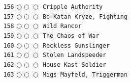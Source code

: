 \documentclass[a4paper,landscape]{article}
\begin{document}
\begin{multicols*}{5}
\texttt{156} \(\bigcirc\!\bigcirc\!\bigcirc\)  \texttt{Cripple Authority} \vspace{-0.3mm}\\ 
\texttt{157} \(\bigcirc\!\bigcirc\!\bigcirc\)  \texttt{Bo-Katan Kryze, Fighting } \vspace{-0.3mm}\\ 
\texttt{158} \(\bigcirc\!\bigcirc\!\bigcirc\)  \texttt{Wild Rancor} \vspace{-0.3mm}\\ 
\texttt{159} \(\bigcirc\!\bigcirc\!\bigcirc\)  \texttt{The Chaos of War} \vspace{-0.3mm}\\ 
\texttt{160} \(\bigcirc\!\bigcirc\!\bigcirc\)  \texttt{Reckless Gunslinger} \vspace{-0.3mm}\\ 
\texttt{161} \(\bigcirc\!\bigcirc\!\bigcirc\)  \texttt{Stolen Landspeeder} \vspace{-0.3mm}\\ 
\texttt{162} \(\bigcirc\!\bigcirc\!\bigcirc\)  \texttt{House Kast Soldier} \vspace{-0.3mm}\\ 
\texttt{163} \(\bigcirc\!\bigcirc\!\bigcirc\)  \texttt{Migs Mayfeld, Triggerman} \vspace{-0.3mm}\\ 

\end{multicols*}
\end{document}

